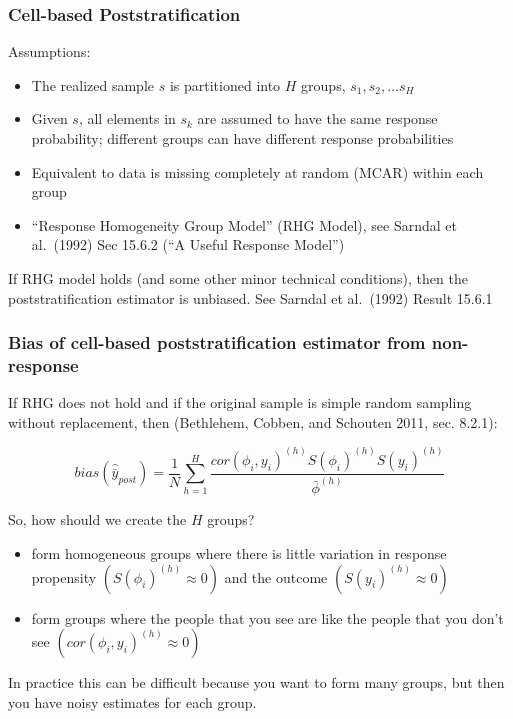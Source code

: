 \documentclass[aspectratio=169]{beamer}
\begin{document}
\begin{frame}
\frametitle{Cell-based Poststratification}

Assumptions:
\begin{itemize}
\item The realized sample $s$ is partitioned into $H$ groups, $s_1, s_2, \ldots s_H$
\item Given $s$, all elements in $s_k$ are assumed to have the same response probability; different groups can have different response probabilities
\item Equivalent to data is missing completely at random (MCAR) within each group
\item ``Response Homogeneity Group Model'' (RHG Model), see Sarndal et al.\ (1992) Sec 15.6.2 (``A Useful Response Model'')
\end{itemize}

\vfill
If RHG model holds (and some other minor technical conditions), then the poststratification estimator is unbiased.  See Sarndal et al.\ (1992) Result 15.6.1 

\end{frame}
\begin{frame}
\frametitle{Bias of cell-based poststratification estimator from non-response}

If RHG does not hold and if the original sample is simple random sampling without replacement, then (Bethlehem, Cobben, and Schouten 2011, sec. 8.2.1):

$$bias(\hat{\bar{y}}_{post}) = \frac{1}{N} \sum_{h=1}^H \frac{cor(\phi_i, y_i)^{(h)} S(\phi_i)^{(h)} S(y_i)^{(h)}}{\bar{\phi}^{(h)}}$$

So, how should we create the $H$ groups? \pause
\begin{itemize}
\item form homogeneous groups where there is little variation in response propensity $(S(\phi_i)^{(h)} \approx 0)$ and the outcome $(S(y_i)^{(h)} \approx 0)$ \pause
\item form groups where the people that you see are like the people that you don't see $(cor(\phi_i, y_i)^{(h)} \approx 0)$
\end{itemize}

\vfill
In practice this can be difficult because you want to form many groups, but then you have noisy estimates for each group.

\end{frame}
\end{document}
